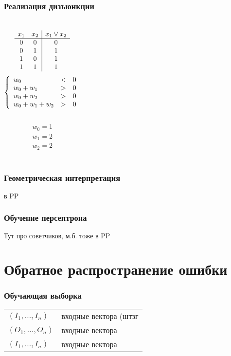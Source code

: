 \documentclass[24pt,pdf,hyperref={unicode}]{beamer}
\begin{document}
\begin{frame}\frametitle{Реализация дизъюнкции}
\begin{columns}
$$
\begin{array}{c c | c}
x_1 & x_2 & x_1\vee x_2 \\
\hline
0 & 0 & 0 \\
0 & 1 & 1 \\
1 & 0 & 1 \\
1 & 1 & 1 \\
\end{array}
$$
$$
\left\{
\begin{array}{l l l l l l}
 w_0       & < & 0 \\
 w_0 + w_1 & > & 0 \\
 w_0 + w_2 & > & 0 \\
 w_0 + w_1 + w_2 & > & 0 \\
\end{array}
\right.
$$\\[1cm]
$$
\begin{array}{l}
 w_0 = 1 \\
 w_1 = 2 \\
 w_2 = 2 \\
\end{array}
$$
\end{columns}
\end{frame}

\begin{frame}\frametitle{Геометрическая интерпретация}
в PP
\end{frame}

\begin{frame}\frametitle{Обучение персептрона}
Тут про советчиков, м.б. тоже в PP
\end{frame}

\section{Обратное распространение ошибки}

\begin{frame}\frametitle{Обучающая выборка}

\begin{tabular}{l l}
 $(I_1,\ldots,I_n)$ & входные вектора (штзг\\
 $(O_1,\ldots,O_n)$ & входные вектора \\
 $(I_1,\ldots,I_n)$ & входные вектора \\
\end{tabular}


\end{frame}
\end{document}
